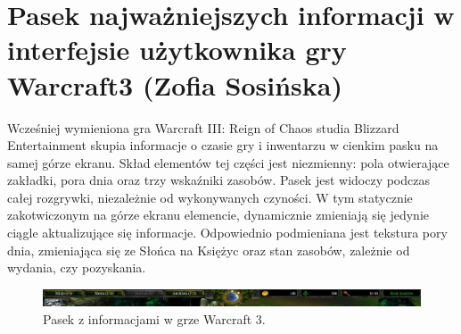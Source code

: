 \section{Pasek najważniejszych informacji w interfejsie użytkownika gry Warcraft3 (Zofia Sosińska)}
Wcześniej wymieniona gra Warcraft III: Reign of Chaos studia Blizzard Entertainment skupia informacje o czasie gry i inwentarzu w cienkim pasku na samej górze ekranu.
Skład elementów tej części jest niezmienny: pola otwierające zakładki, pora dnia oraz trzy wskaźniki zasobów. Pasek jest widoczy
podczas całej rozgrywki, niezależnie od wykonywanych czyności. W tym statycznie zakotwiczonym na górze ekranu elemencie, dynamicznie
zmieniają się jedynie ciągle aktualizujące się informacje. Odpowiednio podmieniana jest tekstura pory dnia, zmieniająca się ze Słońca
na Księżyc oraz stan zasobów, zależnie od wydania, czy pozyskania.


\begin{figure}[htbp]
    \centering
    \includegraphics[width=1.0\textwidth]{images/ui/warcraft3_gorny_pasek.png}
    \caption{Pasek z informacjami w grze Warcraft 3.}\label{fig:Warcraft3}
\end{figure}